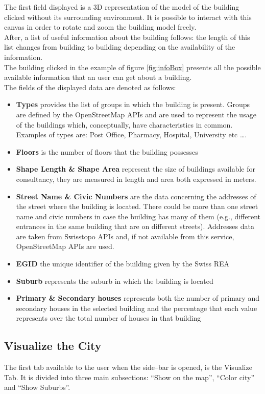 The first field displayed is a 3D representation of the model of the building clicked without its surrounding environment. It is possible to interact with this canvas in order to rotate and zoom the building model freely.\\
After, a list of useful information about the building follows: the length of this list changes from building to building depending on the availability of the information.\\
The building clicked in the example of figure \ref{fig:infoBox} presents all the possible available information that an user can get about a building.\\
The fields of the displayed data are denoted as follows: 
\begin{itemize}
\item {\bf Types} provides the list of groups in which the building is present. Groups are defined by the OpenStreetMap APIs and are used to represent the usage of the buildings which, conceptually, have characteristics in common. Examples of types are: Post Office, Pharmacy, Hospital, University etc \dots.
\item {\bf Floors} is the number of floors that the building possesses
\item {\bf Shape Length \& Shape Area} represent the size of buildings available for consultancy, they are measured in length and area both expressed in meters.
\item {\bf Street Name \& Civic Numbers} are the data concerning the addresses of the street where the building is located. There could be more than one street name and civic numbers in case the building has many of them (e.g., different entrances in the same building that are on different streets). Addresses data are taken from Swisstopo APIs and, if not available from this service, OpenStreetMap APIs are used.
\item {\bf EGID} the unique identifier of the building given by the Swiss REA 
\item {\bf Suburb} represents the suburb in which the building is located
\item {\bf Primary \& Secondary houses} represents both the number of primary and secondary houses in the selected building and the percentage that each value represents over the total number of houses in that building
\end{itemize}

\subsection{Visualize the City}
The first tab available to the user when the side--bar is opened, is the Visualize Tab. It is divided into three main subsections: ``Show on the map'', ``Color city'' and ``Show Suburbs''.\\

